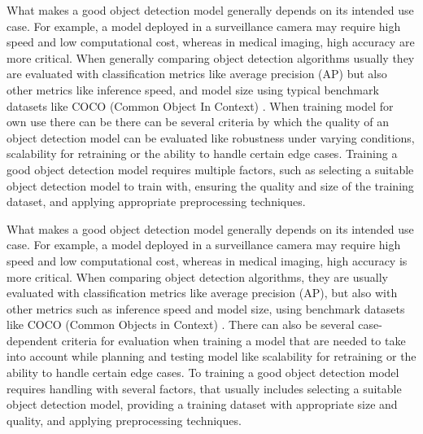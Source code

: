 


What makes a good object detection model generally depends on its intended use case. For example, a model deployed in a surveillance camera may require high speed and low computational cost, whereas in medical imaging, high accuracy are more critical. When generally comparing object detection algorithms usually they are evaluated with classification metrics like average precision (AP) but also other metrics like inference speed, and model size using typical benchmark datasets like COCO (Common Object In Context) \cite{lin2015microsoftcococommonobjects, algocomp, yolo11-docs,xin2024dartautomatedendtoendobject}. When training model for own use there can be there can be several criteria by which the quality of an object detection model can be evaluated like robustness under varying conditions, scalability for retraining or the ability to handle certain edge cases. Training a good object detection model requires multiple factors, such as selecting a suitable object detection model to train with, ensuring the quality and size of the training dataset, and applying appropriate preprocessing techniques.

What makes a good object detection model generally depends on its intended use case. For example, a model deployed in a surveillance camera may require high speed and low computational cost, whereas in medical imaging, high accuracy is more critical. When comparing object detection algorithms, they are usually evaluated with classification metrics like average precision (AP), but also with other metrics such as inference speed and model size, using benchmark datasets like COCO (Common Objects in Context) \cite{lin2015microsoftcococommonobjects, algocomp, yolo11-docs, xin2024dartautomatedendtoendobject}. There can also be several case-dependent criteria for evaluation when training a model that are needed to take into account while planning and testing model like scalability for retraining or the ability to handle certain edge cases. To training a good object detection model requires handling with several factors, that usually includes selecting a suitable object detection model, providing a training dataset with appropriate size and quality, and applying preprocessing techniques.


